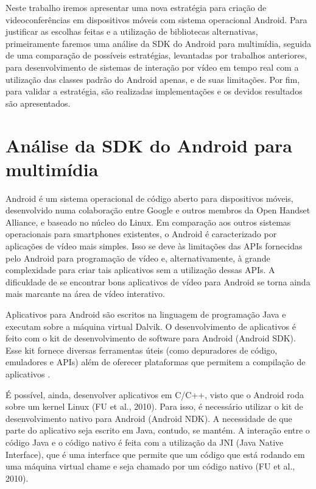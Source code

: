 \documentclass{acm_proc_article-sp}
\begin{document}
Neste trabalho iremos apresentar uma nova estratégia para criação de videoconferências em dispositivos móveis com sistema operacional Android. Para justificar as escolhas feitas e a utilização de bibliotecas alternativas, primeiramente faremos uma análise da SDK do Android para multimídia, seguida de uma comparação de possíveis estratégias, levantadas por trabalhos anteriores, para desenvolvimento de sistemas de interação por vídeo em tempo real com a utilização das classes padrão do Android apenas, e de suas limitações. Por fim, para validar a estratégia, são realizadas implementações e os devidos resultados são apresentados.

\section{Análise da SDK do Android para multimídia}

Android é um sistema operacional de código aberto para dispositivos móveis, desenvolvido numa colaboração entre Google e outros membros da Open Handset Alliance, e baseado no núcleo do Linux. Em comparação aos outros sistemas operacionais para smartphones existentes, o Android é caracterizado por aplicações de vídeo mais simples. Isso se deve às limitações das APIs fornecidas pelo Android para programação de vídeo e, alternativamente, à grande complexidade para criar tais aplicativos sem a utilização dessas APIs. A dificuldade de se encontrar bons aplicativos de vídeo para Android se torna ainda mais marcante na área de vídeo interativo.

Aplicativos para Android são escritos na linguagem de programação Java e executam sobre a máquina virtual Dalvik. O desenvolvimento de aplicativos é feito com o kit de desenvolvimento de software para Android (Android SDK). Esse kit fornece diversas ferramentas úteis (como depuradores de código, emuladores e APIs) além de oferecer plataformas que permitem a compilação de aplicativos \cite{ableson_2009}. 

É possível, ainda, desenvolver aplicativos em C/C++, visto que o Android roda sobre um kernel Linux (FU et al., 2010). Para isso, é necessário utilizar o kit de desenvolvimento nativo para Android (Android NDK). A necessidade de que parte do aplicativo seja escrito em Java, contudo, se mantém. A interação entre o código Java e o código nativo é feita com a utilização da JNI (Java Native Interface), que é uma interface que permite que um código que está rodando em uma máquina virtual chame e seja chamado por um código nativo (FU et al., 2010).
\end{document}
